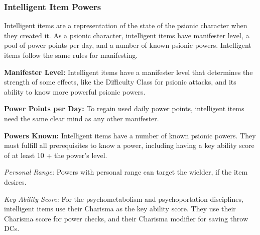 
\subsubsection{Intelligent Item Powers}
Intelligent items are a representation of the state of the psionic character when they created it. As a psionic character, intelligent items have manifester level, a pool of power points per day, and a number of known psionic powers. Intelligent items follow the same rules for manifesting.

\textbf{Manifester Level:} Intelligent items have a manifester level that determines the strength of some effects, like the Difficulty Class for psionic attacks, and its ability to know more powerful psionic powers.

\textbf{Power Points per Day:} To regain used daily power points, intelligent items need the same clear mind as any other manifester.

\textbf{Powers Known:} Intelligent items have a number of known psionic powers. They must fulfill all prerequisites to know a power, including having a key ability score of at least 10 + the power's level.

\textit{Personal Range:} Powers with personal range can target the wielder, if the item desires.

\textit{Key Ability Score:} For the psychometabolism and psychoportation disciplines, intelligent items use their Charisma as the key ability score. They use their Charisma score for power checks, and their Charisma modifier for saving throw DCs.
